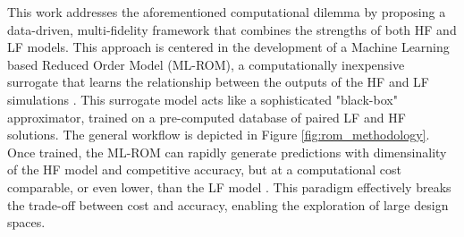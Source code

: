 \documentclass[tg, EN]{ufabcFHZh_tg}
\begin{document}
This work addresses the aforementioned computational dilemma by proposing a data-driven, multi-fidelity framework that combines the strengths of both HF and LF models. This approach is centered in the development of a Machine Learning based Reduced Order Model (ML-ROM), a computationally inexpensive surrogate that learns the relationship between the outputs of the HF and LF simulations \citep{moreira2023, hesthaven2016, benner2015}. This surrogate model acts like a sophisticated "black-box" approximator, trained on a pre-computed database of paired LF and HF solutions. The general workflow is depicted in Figure \ref{fig:rom_methodology}. Once trained, the ML-ROM can rapidly generate predictions with dimensinality of the HF model and competitive accuracy, but at a computational cost comparable, or even lower, than the LF model \citep{yu2019, forrester2008, bekemeyer2025}. This paradigm effectively breaks the trade-off between cost and accuracy, enabling the exploration of large design spaces.
\end{document}
